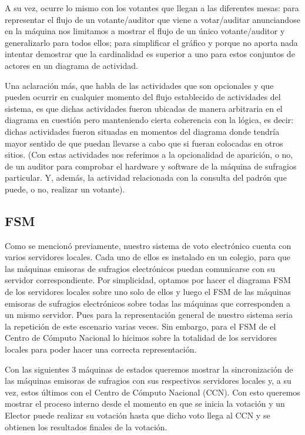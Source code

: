 \documentclass[spanish, 10pt,a4paper]{article}
\numberwithin{equation}{section} %
\begin{document}
\par 
A su vez, ocurre lo mismo con los votantes que llegan a las diferentes mesas: para representar el flujo de un votante/auditor que viene a votar/auditar anunciandose en la m\'aquina nos limitamos a mostrar el flujo de un \'unico votante/auditor y generalizarlo para todos ellos; para simplificar el gr\'afico y porque no aporta nada intentar demostrar que la cardinalidad es superior a uno para estos conjuntos de actores en un diagrama de actividad. 
\par
Una aclaraci\'on m\'as, que habla de las actividades que son opcionales y que pueden ocurrir en cualquier momento del flujo establecido de actividades del sistema, es que dichas actividades fueron ubicadas de manera arbitraria en el diagrama en cuesti\'on pero manteniendo cierta coherencia con la l\'ogica, es decir: dichas actividades fueron situadas en momentos del diagrama donde tendr\'ia mayor sentido de que puedan llevarse a cabo que si fueran colocadas en otros sitios. (Con estas actividades nos referimos a la opcionalidad de aparici\'on, o no, de un auditor para comprobar el hardware y software de la m\'aquina de sufragios particular. Y, adem\'as, la actividad relacionada con la consulta del padr\'on que puede, o no, realizar un votante).


\subsection{FSM}
Como se mencionó previamente, nuestro sistema de voto electr\'onico cuenta con varios servidores locales. Cada uno de ellos es instalado en un colegio, para que las m\'aquinas emisoras de sufragios electr\'onicos puedan comunicarse con su servidor correspondiente. Por simplicidad, optamos por hacer el diagrama FSM de los servidores locales sobre uno solo de ellos y luego el FSM de las m\'aquinas emisoras de sufragios electr\'onicos sobre todas las m\'aquinas que corresponden a un mismo servidor. Pues para la representación general de nuestro sistema seria la repetici\'on de este escenario varias veces. Sin embargo, para el FSM de el Centro de Cómputo Nacional lo hicimos sobre la totalidad de los servidores locales para poder hacer una correcta representaci\'on.\\
\par
Con las siguientes 3 máquinas de estados queremos mostrar la sincronización de las máquinas emisoras de sufragios con sus respectivos servidores locales y, a su vez, estos últimos con el Centro de Cómputo Nacional (CCN). Con esto queremos mostrar el proceso interno desde el momento en que se inicia la votación y un Elector puede realizar su votación hasta que dicho voto llega al CCN y se obtienen los resultados finales de la votación.
\end{document}
